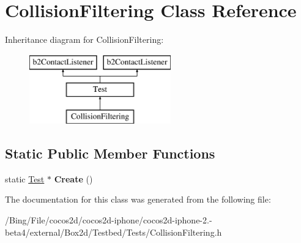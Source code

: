 \hypertarget{class_collision_filtering}{\section{Collision\-Filtering Class Reference}
\label{class_collision_filtering}
}
Inheritance diagram for Collision\-Filtering\-:\begin{figure}[H]
\begin{center}
\leavevmode
\includegraphics[height=3.000000cm]{class_collision_filtering}
\end{center}
\end{figure}
\subsection*{Static Public Member Functions}
\begin{DoxyCompactItemize}
\item 
\hypertarget{class_collision_filtering_a04a26e8d618ca4a613d6ebf14f2c01f5}{static \hyperlink{class_test}{Test} $\ast$ {\bfseries Create} ()}\label{class_collision_filtering_a04a26e8d618ca4a613d6ebf14f2c01f5}

\end{DoxyCompactItemize}


The documentation for this class was generated from the following file\-:\begin{DoxyCompactItemize}
\item 
/\-Bing/\-File/cocos2d/cocos2d-\/iphone/cocos2d-\/iphone-\/2.-\/beta4/external/\-Box2d/\-Testbed/\-Tests/Collision\-Filtering.\-h\end{DoxyCompactItemize}
